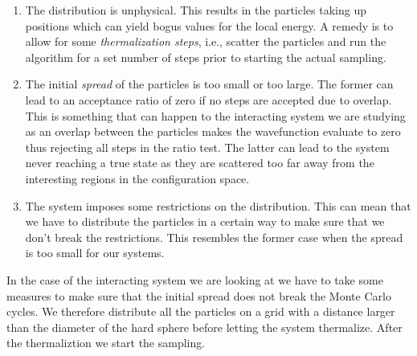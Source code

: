 \documentclass[
    a4paper, aps, twocolumn, floatfix, superscriptaddress,
    nofootinbib]{revtex4-1}
\newcommand{\1}{\mathds{1}}
\begin{document}
            \begin{enumerate}
                \item The distribution is unphysical. This results in the
                    particles taking up positions which can yield bogus values
                    for the local energy. A remedy is to allow for some
                    \emph{thermalization steps}, i.e., scatter the particles and
                    run the algorithm for a set number of steps prior to
                    starting the actual sampling.

                \item The initial \emph{spread} of the particles is too small or
                    too large. The former can lead to an acceptance ratio of
                    zero if no steps are accepted due to overlap. This is
                    something that can happen to the interacting system we are
                    studying as an overlap between the particles makes the
                    wavefunction evaluate to zero thus rejecting all steps in
                    the ratio test.  The latter can lead to the system never
                    reaching a true state as they are scattered too far away
                    from the interesting regions in the configuration space.

                \item The system imposes some restrictions on the distribution.
                    This can mean that we have to distribute the particles in a
                    certain way to make sure that we don't break the
                    restrictions. This resembles the former case when the spread
                    is too small for our systems.
            \end{enumerate}

            In the case of the interacting system we are looking at we have to
            take some measures to make sure that the initial spread does not
            break the Monte Carlo cycles. We therefore distribute all the
            particles on a grid with a distance larger than the diameter of the
            hard sphere before letting the system thermalize. After the
            thermaliztion we start the sampling.
\end{document}
